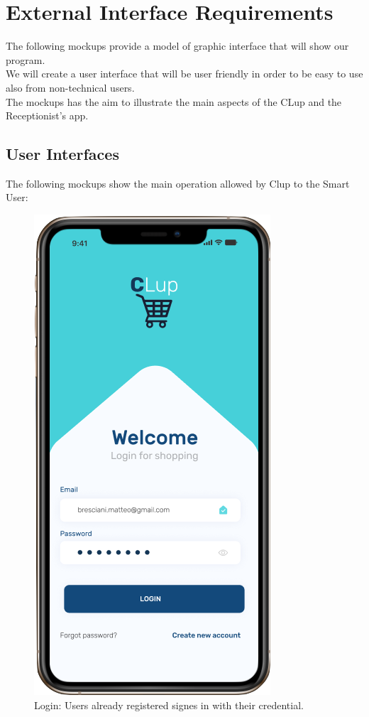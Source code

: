 \section{External Interface Requirements}
The following mockups provide a model of graphic interface that will show our program. \\
We will create a user interface that will be user friendly in order to be easy to use also from non-technical users. \\
The mockups has the aim to illustrate the main aspects of the CLup and the Receptionist's app.
\subsection{User Interfaces}
The following mockups show the main operation allowed by Clup to the Smart User:



\begin{figure}[h]
  \caption{Login: Users already registered signes in with their credential.}
  \label{fig: Login}
  \centering
  \includegraphics[scale=0.35]{images/mockup/login.png}
\end{figure}

